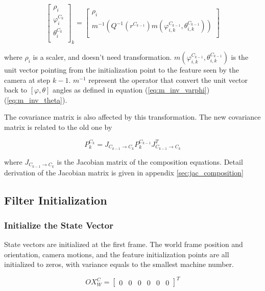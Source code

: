 \begin{equation}
\begin{bmatrix}
\rho_{i} \\
\varphi_{i}^{C_{k}} \\
\theta_{i}^{C_{k}} \\
\end{bmatrix}_{k}=
\begin{bmatrix}
\rho _{i} \\
m^{-1}\left(Q^{-1}(r^{C_{k-1}})m(\varphi _{i, k}^{C_{k-1}}, \theta _{i, k}^{C_{k-1}})\right) \\
\end{bmatrix}
\end{equation}

\noindent where $\rho_i$ is a scaler, and doesn't need transformation.
$m(\varphi_{i, k}^{C_{k-1}}, \theta_{i, k}^{C_{k-1}})$ is the unit
vector pointing from the initialization point to the feature seen by
the camera at step $k-1$. $m^{-1}$ represent the operator that convert
the unit vector back to $[\varphi, \theta]$ angles as defined in
equation (\ref{eq:m_inv_varphi}) (\ref{eq:m_inv_theta}).

The covariance matrix is also affected by this transformation. The new
covariance matrix is related to the old one by

\begin{equation}
P_{k}^{C_{k}}=J_{C_{k-1}\to C_{k}}P_{k}^{C_{k-1}}J_{C_{k-1}\to C_{k}}^{T}
\end{equation}

\noindent where $J_{C_{k-1} \to C_k}$ is the Jacobian matrix of the
composition equations. Detail derivation of the Jacobian matrix is
given in appendix \ref{sec:jac_composition}  

\subsection{Filter Initialization}
\subsubsection{Initialize the State Vector}

State vectors are initialized at the first frame. The world frame
position and orientation, camera motions, and the feature
initialization points are all initialized to zeros, with variance
equals to the smallest machine number.

\begin{equation}
\label{eq:OX_init}
OX_{W}^{C}=\begin{bmatrix}0&0&0&0&0&0\end{bmatrix}^T 
\end{equation}

